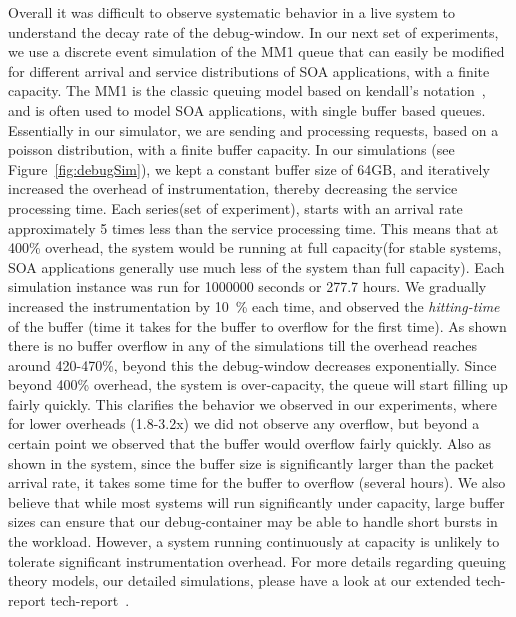 Overall it was difficult to observe systematic behavior in a live system to understand the decay rate of the debug-window. 
In our next set of experiments, we use a discrete event simulation of the M\/M\/1 queue that can easily be modified for different arrival and service distributions of SOA applications, with a finite capacity.
The M\/M\/1 is the classic queuing model based on kendall's notation~\cite{kendall1953}, and is often used to model SOA applications, with single buffer based queues.
Essentially in our simulator, we are sending and processing requests, based on a poisson distribution, with a finite buffer capacity.
In our simulations (see Figure~\ref{fig:debugSim}), we kept a constant buffer size of 64GB, and iteratively increased the overhead of instrumentation, thereby decreasing the service processing time.
Each series(set of experiment), starts with an arrival rate approximately 5 times less than the service processing time. 
This means that at 400\% overhead, the system would be running at full capacity(for stable systems,  SOA applications generally use much less of the system than full capacity).
Each simulation instance was run for 1000000 seconds or 277.7 hours.
We gradually increased the instrumentation by 10~\% each time, and observed the \textit{hitting-time} of the buffer (time it takes for the buffer to overflow for the first time).
As shown there is no buffer overflow in any of the simulations till the overhead reaches around 420-470\%, beyond this the debug-window decreases exponentially.
Since beyond 400\% overhead, the system is over-capacity, the queue will start filling up fairly quickly. 
This clarifies the behavior we observed in our experiments, where for lower overheads (1.8-3.2x) we did not observe any overflow, but beyond a certain point we observed that the buffer would overflow fairly quickly.
Also as shown in the system, since the buffer size is significantly larger than the packet arrival rate, it takes some time for the buffer to overflow (several hours).
We also believe that while most systems will run significantly under capacity, large buffer sizes can ensure that our debug-container may be able to handle short bursts in the workload.
However,  a system running continuously at capacity is unlikely to tolerate significant instrumentation overhead.
For more details regarding queuing theory models, our detailed simulations, please have a look at our extended tech-report tech-report~\cite{parikshanQueue}.

